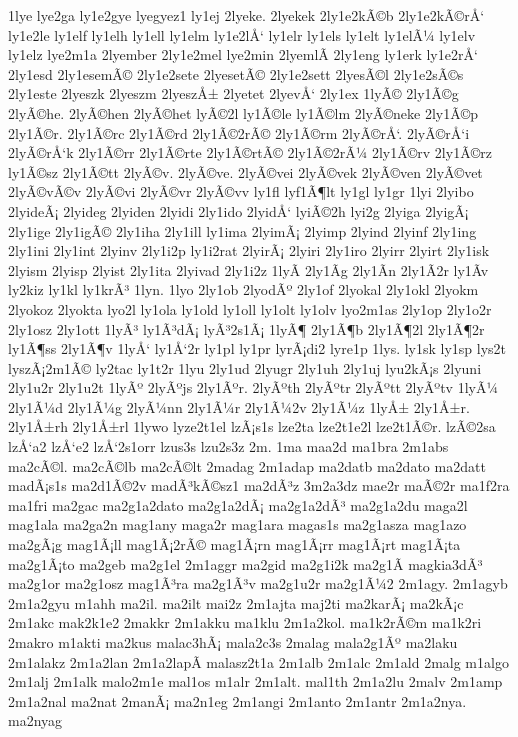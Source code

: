 {1lye
lye2ga
ly1e2gye
lyegyez1
ly1ej
2lyeke.
2lyekek
2ly1e2kÃ©b
2ly1e2kÃ©rÅ‘
ly1e2le
ly1elf
ly1elh
ly1ell
ly1elm
ly1e2lÅ‘
ly1elr
ly1els
ly1elt
ly1elÃ¼
ly1elv
ly1elz
lye2m1a
2lyember
2ly1e2mel
lye2min
2lyemlÃ­
2ly1eng
ly1erk
ly1e2rÅ‘
2ly1esd
2ly1esemÃ©
2ly1e2sete
2lyesetÃ©
2ly1e2sett
2lyesÃ©l
2ly1e2sÃ©s
2ly1este
2lyeszk
2lyeszm
2lyeszÅ±
2lyetet
2lyevÅ‘
2ly1ex
1lyÃ©
2ly1Ã©g
2lyÃ©he.
2lyÃ©hen
2lyÃ©het
lyÃ©2l
ly1Ã©le
ly1Ã©lm
2lyÃ©neke
2ly1Ã©p
2ly1Ã©r.
2ly1Ã©rc
2ly1Ã©rd
2ly1Ã©2rÃ©
2ly1Ã©rm
2lyÃ©rÅ‘.
2lyÃ©rÅ‘i
2lyÃ©rÅ‘k
2ly1Ã©rr
2ly1Ã©rte
2ly1Ã©rtÃ©
2ly1Ã©2rÃ¼
2ly1Ã©rv
2ly1Ã©rz
ly1Ã©sz
2ly1Ã©tt
2lyÃ©v.
2lyÃ©ve.
2lyÃ©vei
2lyÃ©vek
2lyÃ©ven
2lyÃ©vet
2lyÃ©vÃ©v
2lyÃ©vi
2lyÃ©vr
2lyÃ©vv
ly1fl
lyf1Ã¶lt
ly1gl
ly1gr
1lyi
2lyibo
2lyideÃ¡
2lyideg
2lyiden
2lyidi
2ly1ido
2lyidÅ‘
lyiÃ©2h
lyi2g
2lyiga
2lyigÃ¡
2ly1ige
2ly1igÃ©
2ly1iha
2ly1ill
ly1ima
2lyimÃ¡
2lyimp
2lyind
2lyinf
2ly1ing
2ly1ini
2ly1int
2lyinv
2ly1i2p
ly1i2rat
2lyirÃ¡
2lyiri
2ly1iro
2lyirr
2lyirt
2ly1isk
2lyism
2lyisp
2lyist
2ly1ita
2lyivad
2ly1i2z
1lyÃ­
2ly1Ã­g
2ly1Ã­n
2ly1Ã­2r
ly1Ã­v
ly2kiz
ly1kl
ly1krÃ³
1lyn.
1lyo
2ly1ob
2lyodÃº
2ly1of
2lyokal
2ly1okl
2lyokm
2lyokoz
2lyokta
lyo2l
ly1ola
ly1old
ly1oll
ly1olt
ly1olv
lyo2m1as
2ly1op
2ly1o2r
2ly1osz
2ly1ott
1lyÃ³
ly1Ã³dÃ¡
lyÃ³2s1Ã¡
1lyÃ¶
2ly1Ã¶b
2ly1Ã¶2l
2ly1Ã¶2r
ly1Ã¶ss
2ly1Ã¶v
1lyÅ‘
ly1Å‘2r
ly1pl
ly1pr
lyrÃ¡di2
lyre1p
1lys.
ly1sk
ly1sp
lys2t
lyszÃ¡2m1Ã©
ly2tac
ly1t2r
1lyu
2ly1ud
2lyugr
2ly1uh
2ly1uj
lyu2kÃ¡s
2lyuni
2ly1u2r
2ly1u2t
1lyÃº
2lyÃºjs
2ly1Ãºr.
2lyÃºth
2lyÃºtr
2lyÃºtt
2lyÃºtv
1lyÃ¼
2ly1Ã¼d
2ly1Ã¼g
2lyÃ¼nn
2ly1Ã¼r
2ly1Ã¼2v
2ly1Ã¼z
1lyÅ±
2ly1Å±r.
2ly1Å±rh
2ly1Å±rl
1lywo
lyze2t1el
lzÃ¡s1s
lze2ta
lze2t1e2l
lze2t1Ã©r.
lzÃ©2sa
lzÅ‘a2
lzÅ‘e2
lzÅ‘2s1orr
lzus3s
lzu2s3z
2m.
1ma
maa2d
ma1bra
2m1abs
ma2cÃ©l.
ma2cÃ©lb
ma2cÃ©lt
2madag
2m1adap
ma2datb
ma2dato
ma2datt
madÃ¡s1s
ma2d1Ã©2v
madÃ³kÃ©sz1
ma2dÃ³z
3m2a3dz
mae2r
maÃ©2r
ma1f2ra
ma1fri
ma2gac
ma2g1a2dato
ma2g1a2dÃ¡
ma2g1a2dÃ³
ma2g1a2du
maga2l
mag1ala
ma2ga2n
mag1any
maga2r
mag1ara
magas1s
ma2g1asza
mag1azo
ma2gÃ¡g
mag1Ã¡ll
mag1Ã¡2rÃ©
mag1Ã¡rn
mag1Ã¡rr
mag1Ã¡rt
mag1Ã¡ta
ma2g1Ã¡to
ma2geb
ma2g1el
2m1aggr
ma2gid
ma2g1i2k
ma2g1Ã­
magkia3dÃ³
ma2g1or
ma2g1osz
mag1Ã³ra
ma2g1Ã³v
ma2g1u2r
ma2g1Ã¼2
2m1agy.
2m1agyb
2m1a2gyu
m1ahh
ma2il.
ma2ilt
mai2z
2m1ajta
maj2ti
ma2karÃ¡
ma2kÃ¡c
2m1akc
mak2k1e2
2makkr
2m1akku
ma1klu
2m1a2kol.
ma1k2rÃ©m
ma1k2ri
2makro
m1akti
ma2kus
malac3hÃ¡
mala2c3s
2malag
mala2g1Ãº
ma2laku
2m1alakz
2m1a2lan
2m1a2lapÃ­
malasz2t1a
2m1alb
2m1alc
2m1ald
2malg
m1algo
2m1alj
2m1alk
malo2m1e
mal1os
m1alr
2m1alt.
mal1th
2m1a2lu
2malv
2m1amp
2m1a2nal
ma2nat
2manÃ¡
ma2n1eg
2m1angi
2m1anto
2m1antr
2m1a2nya.
ma2nyag
}
